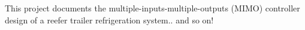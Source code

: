 \abstract
This project documents the multiple-inputs-multiple-outputs (MIMO) controller design of a reefer trailer refrigeration system.. and so on!
